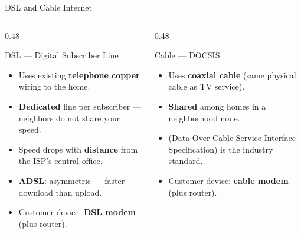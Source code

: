 \documentclass[aspectratio=169]{beamer}  %
\begin{document}
\begin{frame}[t]{DSL and Cable Internet}
    \begin{columns}[T]
        \begin{column}{0.48\textwidth}
            \begin{block}{DSL --- Digital Subscriber Line}
                \begin{itemize}
                    \footnotesize
                    \item Uses existing \textbf{telephone copper} wiring to the home.
                    \item \textbf{Dedicated} line per subscriber --- neighbors do not share your speed.
                    \item Speed drops with \textbf{distance} from the ISP's central office.
                    \item \textbf{ADSL}: asymmetric --- faster download than upload.
                    \item Customer device: \textbf{DSL modem} (plus router).
                \end{itemize}
            \end{block}
        \end{column}
        \begin{column}{0.48\textwidth}
            \begin{block}{Cable --- DOCSIS}
                \begin{itemize}
                    \footnotesize
                    \item Uses \textbf{coaxial cable} (same physical cable as TV service).
                    \item \textbf{Shared} among homes in a neighborhood node.
                    \item {} (Data Over Cable Service Interface Specification) is the industry standard.
                    \item Customer device: \textbf{cable modem} (plus router).
                \end{itemize}
            \end{block}
        \end{column}
    \end{columns}
    \vspace{0.1em}
    \begin{center}

\end{center}
\end{frame}
\end{document}
